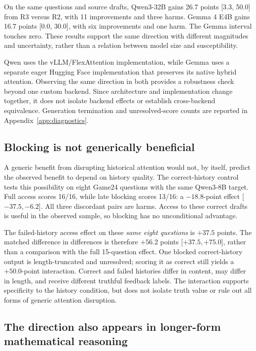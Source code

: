 \documentclass{article}
\begin{document}
On the same questions and source drafts, Qwen3-32B gains 26.7 points [3.3, 50.0] from R3 versus R2, with 11 improvements and three harms. Gemma 4 E4B gains 16.7 points [0.0, 30.0], with six improvements and one harm. The Gemma interval touches zero. These results support the same direction with different magnitudes and uncertainty, rather than a relation between model size and susceptibility.

Qwen uses the vLLM/FlexAttention implementation, while Gemma uses a separate eager Hugging Face implementation that preserves its native hybrid attention. Observing the same direction in both provides a robustness check beyond one custom backend. Since architecture and implementation change together, it does not isolate backend effects or establish cross-backend equivalence. Generation termination and unresolved-score counts are reported in Appendix~\ref{app:diagnostics}.

\subsection{Blocking is not generically beneficial}
\label{sec:specificity}

A generic benefit from disrupting historical attention would not, by itself, predict the observed benefit to depend on history quality. The correct-history control tests this possibility on eight Game24 questions with the same Qwen3-8B target. Full access scores 16/16, while late blocking scores 13/16: a $-18.8$-point effect [${-37.5},{-6.2}$]. All three discordant pairs are harms. Access to these correct drafts is useful in the observed sample, so blocking has no unconditional advantage.

The failed-history access effect on these \emph{same eight questions} is $+37.5$ points. The matched difference in differences is therefore $+56.2$ points [${+37.5},{+75.0}$], rather than a comparison with the full 15-question effect. One blocked correct-history output is length-truncated and unresolved; scoring it as correct still yields a $+50.0$-point interaction. Correct and failed histories differ in content, may differ in length, and receive different truthful feedback labels. The interaction supports specificity to the history condition, but does not isolate truth value or rule out all forms of generic attention disruption.

\subsection{The direction also appears in longer-form mathematical reasoning}
\label{sec:math-replication}
\end{document}
